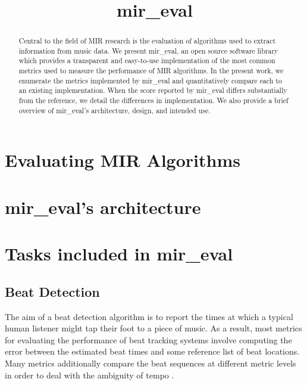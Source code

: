 \documentclass{article}
\title{mir\_eval}
\begin{document}
%
\maketitle
%
\begin{abstract}
Central to the field of MIR research is the evaluation of algorithms used to extract information from music data.  We present mir\_eval, an open source software library which provides a transparent and easy-to-use implementation of the most common metrics used to measure the performance of MIR algorithms.  In the present work, we enumerate the metrics implemented by mir\_eval and quantitatively compare each to an existing implementation.  When the score reported by mir\_eval differs substantially from the reference, we detail the differences in implementation.  We also provide a brief overview of mir\_eval's architecture, design, and intended use.
\end{abstract}
%
\section{Evaluating MIR Algorithms}



\section{mir\_eval's architecture}


\section{Tasks included in mir\_eval}

\subsection{Beat Detection}

The aim of a beat detection algorithm is to report the times at which a typical human listener might tap their foot to a piece of music.  As a result, most metrics for evaluating the performance of beat tracking systems involve computing the error between the estimated beat times and some reference list of beat locations.  Many metrics additionally compare the beat sequences at different metric levels in order to deal with the ambiguity of tempo \cite{levy2011improving}.
\end{document}
